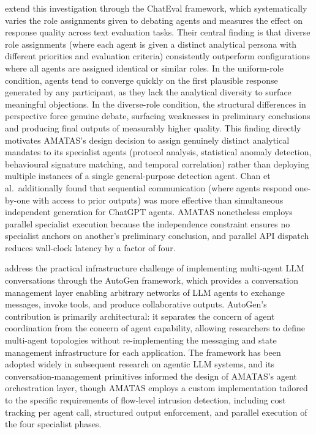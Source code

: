 \documentclass[../main.tex]{subfiles}
\begin{document}
\textcite{Chan2023} extend this investigation through the ChatEval framework, which systematically varies the role assignments given to debating agents and measures the effect on response quality across text evaluation tasks. Their central finding is that diverse role assignments (where each agent is given a distinct analytical persona with different priorities and evaluation criteria) consistently outperform configurations where all agents are assigned identical or similar roles. In the uniform-role condition, agents tend to converge quickly on the first plausible response generated by any participant, as they lack the analytical diversity to surface meaningful objections. In the diverse-role condition, the structural differences in perspective force genuine debate, surfacing weaknesses in preliminary conclusions and producing final outputs of measurably higher quality. This finding directly motivates AMATAS's design decision to assign genuinely distinct analytical mandates to its specialist agents (protocol analysis, statistical anomaly detection, behavioural signature matching, and temporal correlation) rather than deploying multiple instances of a single general-purpose detection agent. Chan et al.\ additionally found that sequential communication (where agents respond one-by-one with access to prior outputs) was more effective than simultaneous independent generation for ChatGPT agents. AMATAS nonetheless employs parallel specialist execution because the independence constraint ensures no specialist anchors on another's preliminary conclusion, and parallel API dispatch reduces wall-clock latency by a factor of four.

\textcite{Wu2023} address the practical infrastructure challenge of implementing multi-agent LLM conversations through the AutoGen framework, which provides a conversation management layer enabling arbitrary networks of LLM agents to exchange messages, invoke tools, and produce collaborative outputs. AutoGen's contribution is primarily architectural: it separates the concern of agent coordination from the concern of agent capability, allowing researchers to define multi-agent topologies without re-implementing the messaging and state management infrastructure for each application. The framework has been adopted widely in subsequent research on agentic LLM systems, and its conversation-management primitives informed the design of AMATAS's agent orchestration layer, though AMATAS employs a custom implementation tailored to the specific requirements of flow-level intrusion detection, including cost tracking per agent call, structured output enforcement, and parallel execution of the four specialist phases.
\end{document}
